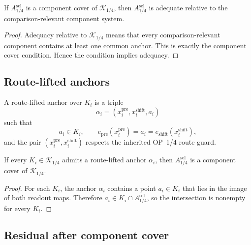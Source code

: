 \begin{lemma}
\label{lem:v410r09-component-cover-implies-adequacy}
If \(A_{1/4}^{\mathrm{sel}}\) is a component cover of
\(\mathcal K_{1/4}\), then \(A_{1/4}^{\mathrm{sel}}\) is adequate relative to
the comparison-relevant component system.
\end{lemma}

\begin{proof}
Adequacy relative to \(\mathcal K_{1/4}\) means that every comparison-relevant
component contains at least one common anchor. This is exactly the component
cover condition. Hence the condition implies adequacy.
\end{proof}

\subsection{Route-lifted anchors}
\label{subsec:v410r09-route-lifted-anchors}

\begin{definition}
\label{def:v410r09-route-lifted-anchor}
A route-lifted anchor over \(K_i\) is a triple
\[
 \alpha_i
 =
 (x_i^{\mathrm{pre}},x_i^{\mathrm{shift}},a_i)
\]
such that
\[
 a_i\in K_i,\qquad
 e_{\mathrm{pre}}(x_i^{\mathrm{pre}})=a_i
 =
 e_{\mathrm{shift}}(x_i^{\mathrm{shift}}),
\]
and the pair \((x_i^{\mathrm{pre}},x_i^{\mathrm{shift}})\) respects the inherited
OP~1/4 route guard.
\end{definition}

\begin{proposition}
\label{prop:v410r09-route-lifted-anchors-certify-component-cover}
If every \(K_i\in\mathcal K_{1/4}\) admits a route-lifted anchor
\(\alpha_i\), then \(A_{1/4}^{\mathrm{sel}}\) is a component cover of
\(\mathcal K_{1/4}\).
\end{proposition}

\begin{proof}
For each \(K_i\), the anchor \(\alpha_i\) contains a point \(a_i\in K_i\) that
lies in the image of both readout maps. Therefore
\(a_i\in K_i\cap A_{1/4}^{\mathrm{sel}}\), so the intersection is nonempty for
every \(K_i\).
\end{proof}

\subsection{Residual after component cover}
\label{subsec:v410r09-residual-after-component-cover}

